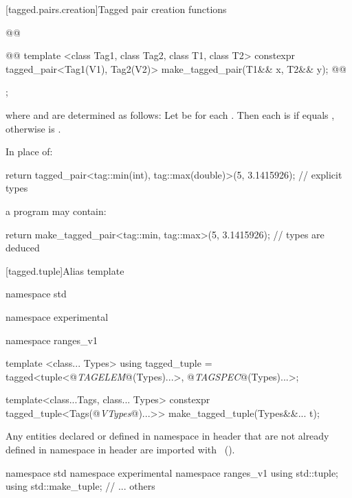 {[tagged.pairs.creation]{Tagged pair creation functions}

%
\begin{itemdecl}
@@

@@
  template <class Tag1, class Tag2, class T1, class T2>
    constexpr tagged_pair<Tag1(V1), Tag2(V2)> make_tagged_pair(T1&& x, T2&& y);
@\newtxt{\}\}\}}@
\end{itemdecl}

\begin{itemdescr}
\pnum
\returns {};

where  and  are determined as follows: Let  be
 for each . Then each  is 
if  equals , otherwise  is
.

\pnum
\enterexample
In place of:

\begin{codeblock}
  return tagged_pair<tag::min(int), tag::max(double)>(5, 3.1415926);   // explicit types
\end{codeblock}

a \Cpp program may contain:

\begin{codeblock}
  return make_tagged_pair<tag::min, tag::max>(5, 3.1415926);           // types are deduced
\end{codeblock}
\exitexample
\end{itemdescr}

{\color{newclr}
[tagged.tuple]{Alias template }


\begin{codeblock}
namespace std { namespace experimental { namespace ranges_v1 {
  template <class... Types>
  using tagged_tuple = tagged<tuple<@\textit{TAGELEM}@(Types)...>,
                              @\textit{TAGSPEC}@(Types)...>;

  template<class...Tags, class... Types>
    constexpr tagged_tuple<Tags(@\textit{VTypes}@)...>> make_tagged_tuple(Types&&... t);
}}}
\end{codeblock}

\pnum
Any entities declared or defined in namespace  in header 
that are not already defined in namespace  in header
 are imported with
~(). \enterexample
\begin{codeblock}
namespace std { namespace experimental { namespace ranges_v1 {
  using std::tuple;
  using std::make_tuple;
  // ... others
}}}
\end{codeblock}
\exitexample
}

}
